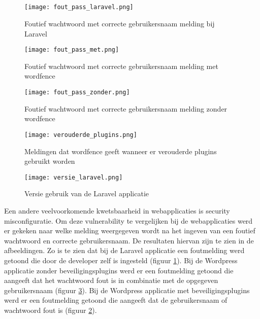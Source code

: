 \subsection{}
\begin{figure}
    \centering
    \texttt{[image: fout\_pass\_laravel.png]}
    \caption[Foutief wachtwoord met correcte gebruikersnaam melding bij Laravel]{Foutief wachtwoord met correcte gebruikersnaam melding bij Laravel}
    \label{fig:sec_mis_laravel}
\end{figure}
\begin{figure}
    \centering
    \texttt{[image: fout\_pass\_met.png]}
    \caption[Foutief wachtwoord met correcte gebruikersnaam melding met wordfence]{Foutief wachtwoord met correcte gebruikersnaam melding met wordfence}
    \label{fig:sec_mis_met}
\end{figure}
\begin{figure}
    \centering
    \texttt{[image: fout\_pass\_zonder.png]}
    \caption[Foutief wachtwoord met correcte gebruikersnaam melding zonder wordefence]{Foutief wachtwoord met correcte gebruikersnaam melding zonder wordfence}
    \label{fig:sec_mis_zonder}
\end{figure}
\begin{figure}
    \centering
    \texttt{[image: verouderde\_plugins.png]}
    \caption[Meldingen dat wordfence geeft wanneer er verouderde plugins gebruikt worden]{Meldingen dat wordfence geeft wanneer er verouderde plugins gebruikt worden}
    \label{fig:verouderde_plugins}
\end{figure}
\begin{figure}
    \centering
    \texttt{[image: versie\_laravel.png]}
    \caption[Versie gebruik van de Laravel applicatie]{Versie gebruik van de Laravel applicatie}
    \label{fig:versie_laravel}
\end{figure}
Een andere veelvoorkomende kwetsbaarheid in webapplicaties is security misconfiguratie. Om deze vulnerability te vergelijken 
bij de webapplicaties werd er gekeken naar welke melding weergegeven wordt na het ingeven van een foutief wachtwoord
en correcte gebruikersnaam. De resultaten hiervan zijn te zien in de afbeeldingen. Zo is te zien dat bij de Laravel 
applicatie een foutmelding werd getoond die door de developer zelf is ingesteld (figuur \ref{fig:sec_mis_laravel}). Bij de Wordpress 
applicatie zonder beveiligingsplugins werd er een foutmelding getoond die aangeeft dat het wachtwoord fout is in combinatie 
met de opgegeven gebruikersnaam (figuur \ref{fig:sec_mis_zonder}). Bij de Wordpress applicatie met beveiligingsplugins werd er een 
foutmelding getoond die aangeeft dat de gebruikersnaam of wachtwoord fout is (figuur \ref{fig:sec_mis_met}).

